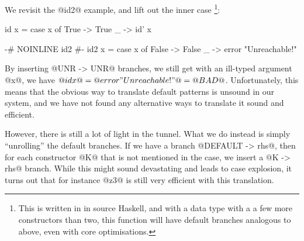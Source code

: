 We revisit the @id2@ example, and
lift out the inner case
\footnote{This is written in in source Haskell, and with a data type
  with a a few more constructors than two, this function will have
  default branches analogous to above, even with core optimisations.
}:

\begin{code}
    id x = case x of
        True -> True
        _    -> id' x

    {-# NOINLINE id2 #-}
    id2 x = case x of
        False -> False
        _     -> error "Unreachable!"
\end{code}

By inserting @UNR -> UNR@ branches, we still get with an ill-typed
argument @x@, we have $@id x@ = @error "Unreachable!"@ = @BAD@$.
Unfortunately, this means that the obvious way to translate default
patterns is unsound in our system, and we have not found any
alternative ways to translate it sound and efficient.

However, there is still a lot of light in the tunnel. What we do
instead is simply ``unrolling'' the default branches.
If we have a branch @DEFAULT -> rhs@, then for each constructor @K@
that is not mentioned in the case, we insert a @K -> rhs@
branch. While this might sound devastating and leads to case
explosion, it turns out that for instance @z3@ is still very efficient
with this translation.






